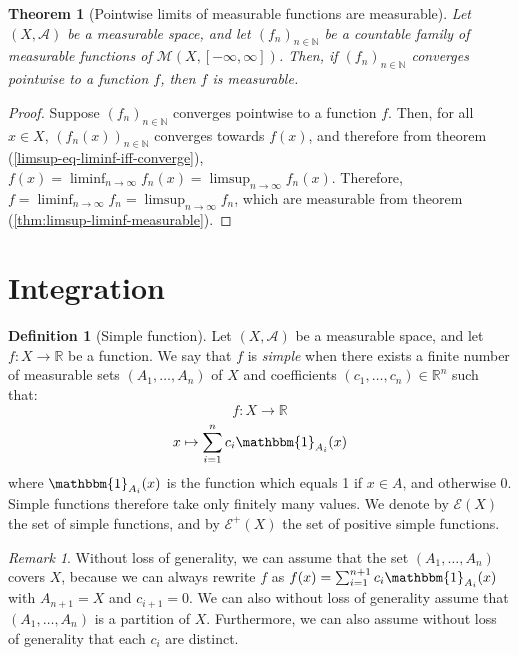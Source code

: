 \documentclass{article}
\newtheorem{theorem}{Theorem}[section]
\theoremstyle{definition}
\newtheorem{definition}{Definition}[section]
\theoremstyle{remark}
\newtheorem*{remark}{Remark}
\theoremstyle{example}
\theoremstyle{notation}
\theoremstyle{axiom}
\begin{document}
\begin{theorem}[Pointwise limits of measurable functions are measurable] \label{thm:limit-measurable-is-measurable} %
		Let $(X, \mathcal{A})$ be a measurable space, and let $(f_n)_{n \in \mathbb{N}}$ be a countable family of measurable functions of $\mathcal{M}(X, [-\infty, \infty])$. Then, if $(f_n)_{n \in \mathbb{N}}$ converges pointwise to a function $f$, then $f$ is measurable.
\end{theorem}

\begin{proof}
		Suppose $(f_n)_{n \in \mathbb{N}}$ converges pointwise to a function $f$. Then, for all $x \in X$, $(f_n(x))_{n \in \mathbb{N}}$ converges towards $f(x)$, and therefore from theorem (\ref{limsup-eq-liminf-iff-converge}), $f(x) = \liminf_{n \rightarrow \infty} f_n(x) = \limsup_{n \rightarrow \infty} f_n(x)$. Therefore, $f = \liminf_{n \rightarrow \infty} f_n = \limsup_{n \rightarrow \infty} f_n$, which are measurable from theorem (\ref{thm:limsup-liminf-measurable}).
\end{proof}

\section{Integration}

\begin{definition}[Simple function] %
		Let $(X, \mathcal{A})$ be a measurable space, and let $f : X \rightarrow \mathbb{R}$ be a function. We say that $f$ is \textit{simple} when there exists a finite number of measurable sets $(A_1, \dots, A_n)$ of $X$ and coefficients $(c_1, \dots, c_n) \in \mathbb{R}^n$ such that:
				$$f : X \rightarrow \mathbb{R}$$
				$$x \mapsto \sum_{i=1}^n c_i \mathbbm{1}_{A_i}(x)$$
				where $\mathbbm{1}_{A_i}(x)$ is the function which equals 1 if $x \in A$, and otherwise 0. Simple functions therefore take only finitely many values. We denote by $\mathcal{E}(X)$ the set of simple functions, and by $\mathcal{E}^+(X)$ the set of positive simple functions.
\end{definition}

\begin{remark}
		Without loss of generality, we can assume that the set $(A_1, \dots, A_n)$ covers $X$, because we can always rewrite $f$ as $f(x) = \sum_{i=1}^{n+1} c_i \mathbbm{1}_{A_i}(x)$ with $A_{n+1} = X$ and $c_{i+1} = 0$. We can also without loss of generality assume that $(A_1, \dots, A_n)$ is a partition of $X$. Furthermore, we can also assume without loss of generality that each $c_i$ are distinct.
\end{remark}
\end{document}
